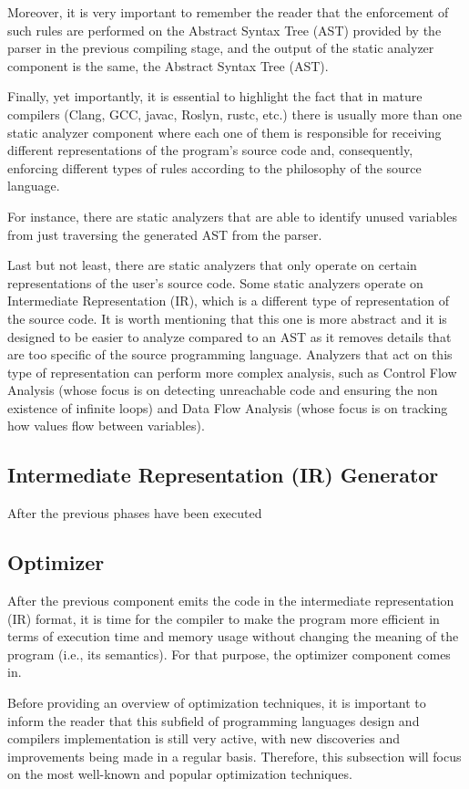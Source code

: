 Moreover, it is very important to remember the reader that the enforcement of such rules are performed on the Abstract Syntax Tree (AST) provided by the parser in the previous compiling stage, and the output of the static analyzer component is the same, the Abstract Syntax Tree (AST).

Finally, yet importantly, it is essential to highlight the fact that in mature compilers (Clang, GCC, javac, Roslyn, rustc, etc.) there is usually more than one static analyzer component where each one of them is responsible for receiving different representations of the program's source code and, consequently, enforcing different types of rules according to the philosophy of the source language.

For instance, there are static analyzers that are able to identify unused variables from just traversing the generated AST from the parser.

Last but not least, there are static analyzers that only operate on certain representations of the user's source code. Some static analyzers operate on Intermediate Representation (IR), which is a different type of representation of the source code. It is worth mentioning that this one is more abstract and it is designed to be easier to analyze compared to an AST as it removes details that are too specific of the source programming language. Analyzers that act on this type of representation can perform more complex analysis, such as Control Flow Analysis (whose focus is on detecting unreachable code and ensuring the non existence of infinite loops) and Data Flow Analysis (whose focus is on tracking how values flow between variables).

\subsection{Intermediate Representation (IR) Generator}
After the previous phases have been executed

\subsection{Optimizer}
After the previous component emits the code in the intermediate representation (IR) format, it is time for the compiler to make the program more efficient in terms of execution time and memory usage without changing the meaning of the program (i.e., its semantics). For that purpose, the optimizer component comes in.

Before providing an overview of optimization techniques, it is important to inform the reader that this subfield of programming languages design and compilers implementation is still very active, with new discoveries and improvements being made in a regular basis. Therefore, this subsection will focus on the most well-known and popular optimization techniques.

